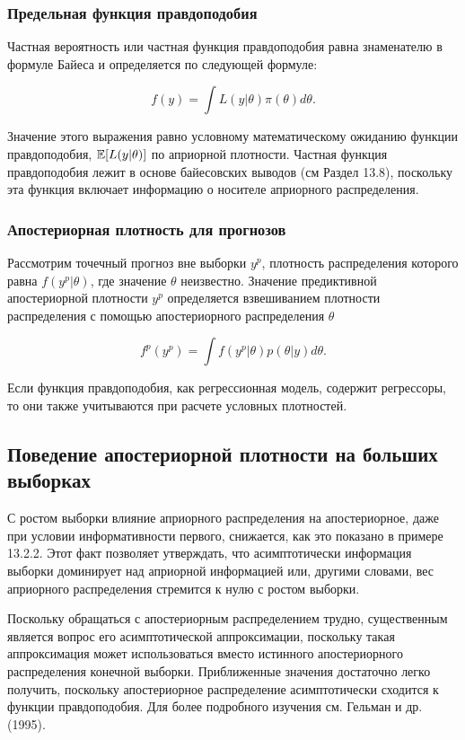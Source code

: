 \subsubsection*{Предельная функция правдоподобия}

Частная вероятность или частная функция правдоподобия равна знаменателю в формуле Байеса и определяется по следующей формуле: 

\begin{equation}
f(y)=\int{L(y|\theta)}\pi(\theta)d\theta.
\end{equation}

Значение этого выражения равно условному математическому ожиданию функции правдоподобия, $\mathbb{E}[L(y|\theta)]$ по априорной плотности. Частная функция правдоподобия лежит в основе байесовских выводов (см Раздел 13.8), поскольку эта функция включает информацию о носителе априорного распределения.

\subsubsection*{Апостериорная плотность для прогнозов}

Рассмотрим точечный прогноз вне выборки $y^p$, плотность распределения которого равна $f(y^p|\theta)$, где значение $\theta$ неизвестно. Значение предиктивной апостериорной плотности $y^p$ определяется взвешиванием плотности распределения с помощью апостериорного  распределения $\theta$

\begin{equation}
f^{p}(y^p)=\int{f(y^p|\theta)p(\theta|y)d\theta}.
\end{equation}

Если  функция правдоподобия, как регрессионная модель, содержит регрессоры, то они также учитываются при расчете условных плотностей. 

\subsection{Поведение апостериорной плотности на больших выборках}

С ростом выборки влияние априорного распределения на апостериорное, даже при условии информативности первого, снижается, как это показано в примере 13.2.2. Этот факт позволяет утверждать, что асимптотически информация выборки доминирует над априорной информацией или, другими словами, вес априорного распределения  стремится к нулю с ростом выборки.

Поскольку обращаться с апостериорным распределением трудно, существенным является вопрос его асимптотической аппроксимации, поскольку такая аппроксимация может использоваться вместо истинного апостериорного распределения конечной выборки. Приближенные значения достаточно легко получить, поскольку апостериорное распределение асимптотически сходится к функции правдоподобия. Для более подробного изучения см. Гельман и др. (1995).

